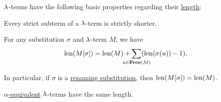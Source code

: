 \begin{proposition}\label{thm:def:lambda_term_length}
  \( \mathrm{\lambda} \)-terms have the following basic properties regarding their \hyperref[def:lambda_term_length]{length}:
  \begin{thmenum}
     Every strict subterm of a \( \mathrm{\lambda} \)-term is strictly shorter.

     For any substitution \( \sigma \) and \( \mathrm{\lambda} \)-term \( M \), we have
    \begin{equation}\label{eq:thm:def:lambda_term_length/substitution}
      \len(M[\sigma]) = \len(M) + \sum_{\mathclap{u \in \op*{Free}(M)}} (\len(\sigma(u)) - 1).
    \end{equation}

    In particular, if \( \sigma \) is a \hyperref[def:lambda_renaming]{renaming substitution}, then \( \operatorname{len}(M[\sigma]) = \operatorname{len}(M) \).

     \hyperref[def:lambda_term_alpha_equivalence]{\( \alpha \)-equivalent}  \( \mathrm{\lambda} \)-terms have the same length.
  \end{thmenum}
\end{proposition}
